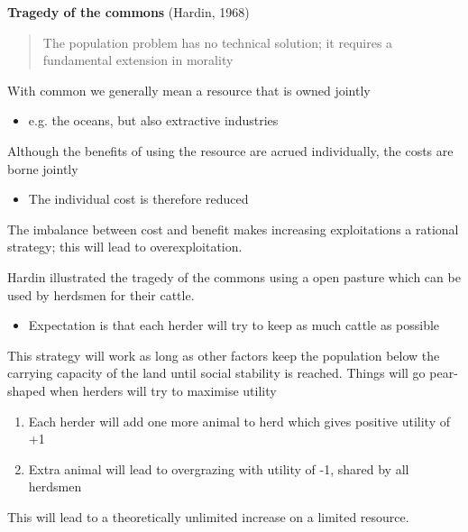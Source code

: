 \documentclass{beamer}
\begin{document}


\begin{frame}
  \textbf{Tragedy of the commons} (Hardin, 1968)
  \begin{quote}
    The population problem has no technical solution; it requires a fundamental extension in morality
  \end{quote}
\end{frame}

\begin{frame}
  With common we generally mean a resource that is owned jointly
  \begin{itemize}
    \item e.g. the oceans, but also extractive industries
  \end{itemize}
  \medskip
  Although the benefits of using the resource are acrued individually, the costs are borne jointly
  \begin{itemize}
    \item The individual cost is therefore reduced
  \end{itemize}
  \medskip
  The imbalance between cost and benefit makes increasing exploitations a rational strategy; this will lead to overexploitation.
\end{frame}

\begin{frame}
 Hardin illustrated the tragedy of the commons using a open pasture which can be used by herdsmen for their cattle.
 \begin{itemize}
   \item Expectation is that each herder will try to keep as much cattle as possible
 \end{itemize}
 \medskip
 This strategy will work as long as other factors keep the population below the carrying capacity of the land until social stability is reached. 
 Things will go pear-shaped when herders will try to maximise utility
 \begin{enumerate}
   \item Each herder will add one more animal to herd which gives positive utility of +1
   \item Extra animal will lead to overgrazing with utility of -1, shared by all herdsmen
 \end{enumerate}
 \medskip
 This will lead to a theoretically unlimited increase on a limited resource.
\end{frame}
\end{document}
